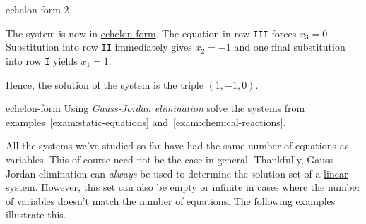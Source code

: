 \begin{example}{}{echelon-form-2}
\begin{center}
 \end{center}
 The system is now in \hyperref[def:echelon-form]{echelon form}. The equation in
 row \texttt{III} forces $x_3 = 0$. Substitution into row \texttt{II}
 immediately gives $x_2 = -1$ and one final substitution into row \texttt{I}
 yields $x_1 = 1$.

 Hence, the solution of the system is the triple $(1, -1, 0)$.
\end{example}

\begin{exercise}{}{echelon-form}
 Using \emph{Gauss-Jordan elimination} solve the systems from
 examples~\ref{exam:static-equations} and~\ref{exam:chemical-reactions}.
\end{exercise}

All the systems we've studied so far have had the same number of equations as
variables. This of course need not be the case in general. Thankfully,
Gauss-Jordan elimination can \emph{always} be used to determine the solution set
of a \hyperref[def:linear-system]{linear system}. However, this set can also be
empty or infinite in cases where the number of variables doesn't match the
number of equations. The following examples illustrate this.

